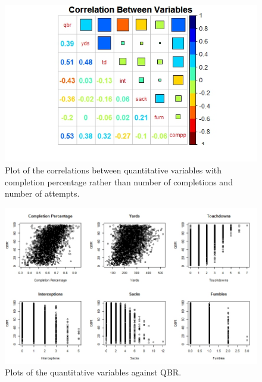 \documentclass[12pt]{article}\usepackage[]{graphicx}\usepackage[]{color}
\begin{document}
\newpage

\begin{figure}[h]
\centering
\includegraphics[width=1.2\textwidth]{correlation2.jpeg}
\captionsetup{font=footnotesize,labelfont=footnotesize}
\caption{\label{fig:corr2} Plot of the correlations between quantitative variables with completion percentage rather than number of completions and number of attempts.}
\end{figure}

\begin{figure}[h]
	\centering
	\includegraphics[width=1.2\textwidth]{allthescatters.jpeg}
	\captionsetup{font=footnotesize,labelfont=footnotesize}
	\caption{\label{fig:allthescatters} Plots of the quantitative variables against QBR.}
\end{figure}
\end{document}
